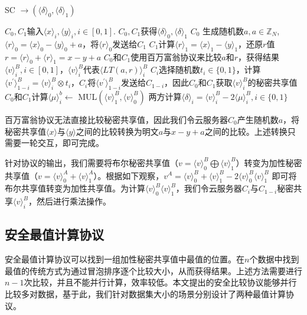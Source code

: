 \begin{algorithm}[htbp]
    \renewcommand{\algorithmicrequire}{\textbf{输入:}}
    \renewcommand{\algorithmicensure}{\textbf{输出:}}
    \caption{SC $\rightarrow (\langle \delta \rangle_0, \langle \delta \rangle_1)$}
    \label{alg_sc}
    \begin{algorithmic}[1]
        \REQUIRE $C_0,C_1$输入$\langle x \rangle_i, \langle y \rangle_i, i\in [0,1]$.
        \ENSURE $C_0,C_1$获得$\langle \delta\rangle_0, \langle \delta\rangle_1$
        \STATE $C_0$ 生成随机数$a, a\in \mathbb{Z}_N$, $\langle r \rangle_0=\langle x \rangle_0-\langle y\rangle_0+a$，将$\langle r \rangle_0$发送给$C_1$
        \STATE $C_1$计算$\langle r \rangle_1 = \langle x \rangle_1-\langle y\rangle_1$，还原$r$值$r=\langle r \rangle_0 + \langle r \rangle_1 = x-y+a$
        \STATE $C_0$和$C_1$使用百万富翁协议来比较$a$和$r$，获得结果$\langle v \rangle_i^B, i\in[0,1]$，$\langle v \rangle_i^B$代表$\langle LT(a,r)\rangle_i^B$
        \STATE $C_i$选择随机数$t_i \in \{0,1\}$，计算$\langle v^{'}\rangle_{1-i}^B=\langle v \rangle_i^B \otimes  t_i$，$C_i$将$\langle v^{'}\rangle_{1-i}^B$发送给$C_{1-i}$，因此$C_0$和$C_1$获取$\langle v \rangle_i^B$的秘密共享值
        \STATE $C_0$和$C_1$计算$\langle\mu \rangle_i^b \leftarrow$ MUL$(\langle v\rangle_1^B,\langle v\rangle_0^B)$
        \STATE 两方计算$ \langle \delta \rangle_i= \langle v \rangle_i^B -  2\langle\mu \rangle_i^B,i\in\{0, 1\}$

    \end{algorithmic}
\end{algorithm}

百万富翁协议无法直接比较秘密共享值，因此我们令云服务器$C_0$产生随机数$a$，将秘密共享值$\langle x \rangle$与$\langle y\rangle$之间的比较转换为明文$a$与$x-y+a$之间的比较。上述转换只需要一轮交互，即可完成。

针对协议的输出，我们需要将布尔秘密共享值（$v=\langle v\rangle^B_0 \bigoplus \langle v\rangle^B_1$）转变为加性秘密共享值（$v=\langle v\rangle^A_0+\langle v \rangle^A_1$）。根据如下观察，$v^A=\langle v\rangle^B_0+\langle v\rangle^B_1 - 2\langle v\rangle^B_0 \langle v\rangle^B_1$ 即可将布尔共享值转变为加性共享值。为计算$\langle v\rangle^B_0 \langle v\rangle^B_1$，我们令云服务器$C_i$与$C_{1-i}$秘密共享$\langle v \rangle_i^B$，然后进行乘法操作。


\subsection{安全最值计算协议}
安全最值计算协议可以找到一组加性秘密共享值中最值的位置。在$n$个数据中找到最值的传统方式为通过冒泡排序逐个比较大小，从而获得结果。上述方法需要进行$n-1$次比较，并且不能并行计算，效率较低。本文提出的安全比较协议能够并行比较多对数据，基于此，我们针对数据集大小的场景分别设计了两种最值计算协议。

